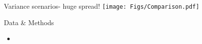 \documentclass[20pt,usenames,dvipsnames]{beamer}
\begin{document}

\begin{frame}[plain]
\Huge
Variance scenarios- huge spread!
\texttt{[image: Figs/Comparison.pdf]}
\end{frame}


\begin{frame}[plain]
\Large
\begin{block}{Data \& Methods}
\begin{itemize}[<+->]
\item 
\end{itemize}
\end{block}
\end{frame}





\end{document}
